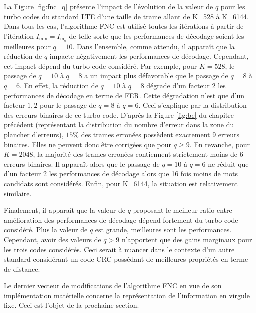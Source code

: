 La Figure \ref{fig:fnc_q} présente l'impact de l'évolution de la valeur de $q$ pour les turbo codes du standard LTE 
d'une taille de trame allant de K=528 à K=6144. Dans tous les cas, l'algorithme FNC est utilisé toutes les itérations à 
partir de l'itération $I_\text{min} = I_{\text{m}_\text{o}}$ de telle sorte que les performances de décodage 
soient les meilleures pour $q=10$. Dans l'ensemble, comme attendu, il apparaît que la réduction de $q$ impacte 
négativement les performances de décodage. Cependant, cet impact dépend du turbo code considéré. Par exemple, pour 
$K=528$, le passage de $q=10$ à $q=8$ a un impact plus défavorable que le passage de $q=8$ à $q=6$. 
En effet, la réduction de $q=10$ à $q=8$ dégrade d'un facteur 2 les performances de décodage en terme de FER. Cette dégradation n'est que 
d'un facteur $1,2$ pour le passage de $q=8$ à $q=6$.
Ceci s'explique par
la distribution des erreurs binaires de ce turbo code. 
D'après la Figure \ref{fig:be} du chapitre précédent (représentant la distribution du nombre d'erreur dans la zone du 
plancher d'erreurs), $15\%$ des trames erronées possèdent exactement 9 erreurs binaires. 
Elles ne peuvent donc être corrigées que pour $q\geq 9$. 
En revanche, pour $K=2048$, la majorité des trames erronées contiennent strictement moins de 6 erreurs binaires.
Il apparaît alors que le passage de $q=10$ à $q=6$ ne réduit que d'un facteur 2 les performances de décodage alors que 
16 fois moins de mots candidats sont considérés.
Enfin, pour K=6144, la situation est relativement similaire.

Finalement, il apparaît que la valeur de $q$ proposant le meilleur ratio entre amélioration des performances de décodage 
dépend fortement du turbo code considéré. Plus la valeur de $q$ est grande, meilleures sont les performances. Cependant,
avoir des valeurs de $q>9$ n'apportent que des gains marginaux pour les trois codes considérés. Ceci serait à nuancer dans le contexte 
d'un autre standard considérant un code CRC possédant de meilleures propriétés en terme de distance.

Le dernier vecteur de modifications de l'algorithme FNC en vue de son implémentation matérielle concerne la représentation de 
l'information en virgule fixe. Ceci est l'objet de la prochaine section.

